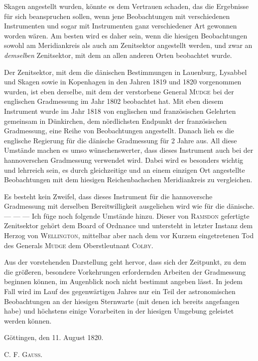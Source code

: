 %
Skagen angestellt wurden, könnte es dem Vertrauen schaden, das die Ergebnisse für sich beanspruchen sollen, wenn jene Beobachtungen mit verschiedenen Instrumenten und sogar mit Instrumenten ganz verschiedener Art gewonnen worden wären. Am besten wird es daher sein, wenn die hiesigen Beobachtungen sowohl am Meridiankreis als auch am Zenitsektor angestellt werden, und zwar an \textit{demselben} Zenitsektor, mit dem an allen anderen Orten beobachtet wurde.

Der Zenitsektor, mit dem die dänischen Bestimmungen in Lauenburg, Lysabbel und Skagen sowie in Kopenhagen in den Jahren 1819 und 1820 vorgenommen wurden, ist eben derselbe, mit dem der verstorbene General \textsc{Mudge} bei der englischen Gradmessung im Jahr 1802 beobachtet hat. Mit eben diesem Instrument wurde im Jahr 1818 von englischen und französischen Gelehrten gemeinsam in Dünkirchen, dem nördlichsten Endpunkt der französischen Gradmessung, eine Reihe von Beobachtungen angestellt. Danach lieh es die englische Regierung für die dänische Gradmessung für 2 Jahre aus. All diese Umstände machen es umso wünschenswerter, dass dieses Instrument auch bei der hannoverschen Gradmessung verwendet wird. Dabei wird es besonders wichtig und lehrreich sein, es durch gleichzeitige und an einem einzigen Ort angestellte Beobachtungen mit dem hiesigen Reichenbachschen Meridiankreis zu vergleichen.

Es besteht kein Zweifel, dass dieses Instrument für die hannoversche Gradmessung mit derselben Bereitwilligkeit ausgeliehen wird wie für die dänische. — — — Ich füge noch folgende Umstände hinzu. Dieser von \textsc{Ramsdon} gefertigte Zenitsektor gehört dem Board of Ordnance und untersteht in letzter Instanz dem Herzog von \textsc{Wellington}, mittelbar aber nach dem vor Kurzem eingetretenen Tod des Generals \textsc{Mudge} dem Oberstleutnant \textsc{Colby}.

Aus der vorstehenden Darstellung geht hervor, dass sich der Zeitpunkt, zu dem die größeren, besondere Vorkehrungen erfordernden Arbeiten der Gradmessung beginnen können, im Augenblick noch nicht bestimmt angeben lässt. In jedem Fall wird im Lauf des gegenwärtigen Jahres nur ein Teil der astronomischen Beobachtungen an der hiesigen Sternwarte (mit denen ich bereits angefangen habe) und höchstens einige Vorarbeiten in der hiesigen Umgebung geleistet werden können.

Göttingen, den 11. August 1820.
\begin{flushright}C. F. \textsc{Gauss}.\end{flushright}

